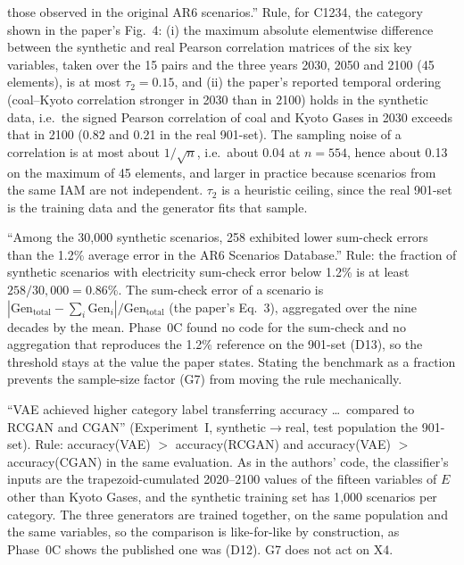\documentclass[11pt,a4paper]{article}
\newcommand{\claim}[1]{\textbf{#1}}
\begin{document}
\begin{description}[style=nextline]
  those observed in the original AR6 scenarios.'' Rule, for C1234, the
  category shown in the paper's Fig.~4: (i) the maximum absolute
  elementwise difference between the synthetic and real Pearson
  correlation matrices of the six key variables, taken over the 15 pairs and the three
  years 2030, 2050 and 2100 (45 elements), is at most $\tau_{2}=0.15$, and
  (ii) the paper's reported temporal ordering (coal--Kyoto correlation
  stronger in 2030 than in 2100) holds in the synthetic data, i.e.\
  the signed Pearson correlation of coal and Kyoto Gases in 2030 exceeds
  that in 2100 (0.82 and 0.21 in the real 901-set). The sampling
  noise of a correlation is at most about $1/\sqrt{n}$, i.e.\ about 0.04 at
  $n=554$, hence about 0.13 on the maximum of 45 elements, and larger in
  practice because scenarios from the same IAM are not independent.
  $\tau_{2}$ is a heuristic ceiling, since the real 901-set is the training
  data and the generator fits that sample.
\item[\claim{X3} (internal consistency).] ``Among the 30{,}000 synthetic
  scenarios, 258 exhibited lower sum-check errors than the 1.2\% average
  error in the AR6 Scenarios Database.'' Rule: the fraction of
  synthetic scenarios with electricity sum-check error below 1.2\% is at
  least $258/30{,}000 = 0.86\%$. The sum-check error of a scenario
  is $|\mathrm{Gen}_{\mathrm{total}}-\sum_i
  \mathrm{Gen}_i|/\mathrm{Gen}_{\mathrm{total}}$ (the paper's Eq.~3),
  aggregated over the nine decades by the mean. Phase~0C found no
  code for the sum-check and no aggregation that reproduces the 1.2\%
  reference on the 901-set (D13), so the threshold stays at the value the
  paper states. Stating the benchmark as a
  fraction prevents the sample-size factor (G7) from moving the rule
  mechanically.
\item[\claim{X4} (VAE superiority).] ``VAE achieved higher category label
  transferring accuracy \dots\ compared to RCGAN and CGAN'' (Experiment~I,
  synthetic$\to$real, test population the 901-set). Rule: accuracy(VAE)
  $>$ accuracy(RCGAN) and accuracy(VAE) $>$ accuracy(CGAN) in the same
  evaluation. As in the authors' code, the classifier's inputs are the
  trapezoid-cumulated 2020--2100 values of the fifteen variables of $E$
  other than Kyoto Gases, and the synthetic training set has 1{,}000
  scenarios per category. The three generators are trained together, on the
  same population and the same variables, so the comparison is
  like-for-like by construction, as Phase~0C shows the
  published one was (D12). G7 does not act on X4.

\end{description}
\end{document}
